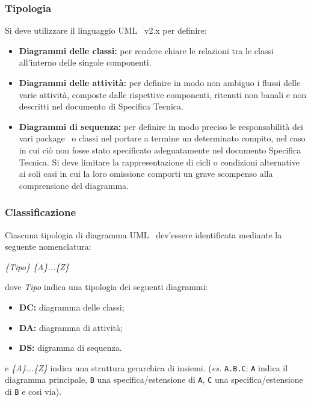 {{\subsubsection{Tipologia}{
Si deve utilizzare il linguaggio UML\g~ v2.x per definire:
\begin{itemize}
	\item [] \textbf{Diagrammi delle classi:} {per rendere chiare le relazioni tra le classi all'interno delle singole componenti.}
	\item [] \textbf{Diagrammi delle attività:} {per definire in modo non ambiguo i flussi delle varie attività, composte dalle rispettive componenti, ritenuti non banali e non descritti nel documento di Specifica Tecnica.}
	\item [] \textbf{Diagrammi di sequenza:} {per definire in modo preciso le responsabilità dei vari package\g~ o classi nel portare a termine un determinato compito, nel caso in cui  ciò non fosse stato specificato adeguatamente nel documento Specifica Tecnica. Si deve limitare la rappresentazione di cicli o condizioni alternative ai soli casi in cui la loro omissione comporti un grave scompenso alla comprensione del diagramma.}
\end{itemize}
}%
\subsubsection{Classificazione}\label{classCAS}{
Ciascuna tipologia di diagramma UML\g~ dev'essere identificata mediante la seguente nomenclatura:
\begin{center}
			\textit{\{Tipo\} \{A\}...\{Z\}}
		\end{center}dove \textit{Tipo} indica una tipologia dei seguenti diagrammi:
		\begin{itemize}
			\item [] \textbf{DC:} diagramma delle classi;
			\item [] \textbf{DA:} diagramma di attività;
			\item [] \textbf{DS:} digramma di sequenza.
		\end{itemize}e \textit{\{A\}...\{Z\}} indica una struttura gerarchica di insiemi. (\textit{es.} \texttt{A.B.C}: \texttt{A} indica il diagramma principale, \texttt{B} una specifica/estensione di \texttt{A}, \texttt{C} una specifica/estensione di \texttt{B} e cosi via). \\
}%

}%

}
